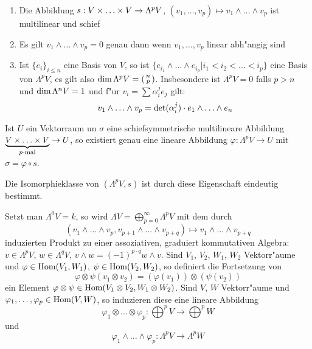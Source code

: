 \begin{emptythm}[Eigenschaften:]\begin{enumerate}[label=\arabic*),leftmargin=*]
\item
	Die Abbildung $s: V \times \ldots \times V \to \Lambda^p V$, $(v_1,\ldots ,v_p) \mapsto v_1 \wedge \ldots \wedge v_p$ ist multilinear und schief
\item
	Es gilt $v_1 \wedge \ldots \wedge v_p = 0$ genau dann wenn $v_1, \ldots , v_p$ linear abh"angig sind
\item
	Ist $\{e_i\}_{i \le n}$ eine Basis von $V$, so ist $\{e_{i_1} \wedge \ldots \wedge e_{i_p} | i_1 < i_2 < \ldots < i_p\}$ eine Basis von $\Lambda^pV$, es gilt also $\operatorname{dim} \Lambda^pV = \left( \begin{smallmatrix} n \\ p \end{smallmatrix} \right)$. Insbesondere ist $\Lambda^pV = 0$ falls $p > n$ und $\operatorname{dim} \Lambda^nV = 1$ und f"ur $v_i = \sum \alpha_i^j e_j$ gilt:
		\[ v_1 \wedge \ldots \wedge v_p = \operatorname{det} (\alpha_i^j) \cdot e_1 \wedge \ldots \wedge e_n \]
\end{enumerate}\end{emptythm}

\begin{emptythm}
Ist $U$ ein Vektorraum un $\sigma$ eine schiefsymmetrische multilineare Abbildung $\underbrace{V \times \ldots  \times V}_{p\text{-mal}} \to U$, so existiert genau eine lineare Abbildung $\varphi: \Lambda^pV \to U$ mit $\sigma = \varphi \circ s$.
\begin{center}\end{center}
Die Isomorphieklasse von $(\Lambda^pV, s)$ ist durch diese Eigenschaft eindeutig bestimmt.
\end{emptythm}

Setzt man $\Lambda^0V = k$, so wird $\Lambda V = \bigoplus_{p=0}^{\infty}\Lambda^pV$ mit dem durch
	\[ (v_1 \wedge \ldots \wedge v_p, v_{p+1} \wedge \ldots \wedge v_{p+q}) \mapsto v_1 \wedge \ldots \wedge v_{p+q} \]
induzierten Produkt zu einer assoziativen, graduiert kommutativen Algebra: $v \in \Lambda^pV$, $w \in \Lambda^qV$, $v \wedge w = (-1)^{p \cdot q} w \wedge v$. Sind $V_1$, $V_2$, $W_1$, $W_2$ Vektorr"aume und $\varphi \in \operatorname{Hom}(V_1, W_1)$, $\psi \in \operatorname{Hom}(V_2, W_2)$, so definiert die Fortsetzung von 
	\[ \varphi \otimes \psi (v_1 \otimes v_2) = (\varphi(v_1)) \otimes (\psi(v_2)) \]
ein Element $\varphi \otimes \psi \in \operatorname{Hom}(V_1 \otimes V_2, W_1 \otimes W_2)$. Sind $V$, $W$ Vektorr"aume und $\varphi_1,\ldots ,\varphi_p \in \operatorname{Hom}(V, W)$, so induzieren diese eine lineare Abbildung
	\[ \varphi_1 \otimes \ldots \otimes \varphi_p : \bigoplus^p V \to \bigoplus^p W \]
und
	\[ \varphi_1 \wedge \ldots  \wedge \varphi_p : \Lambda^pV \to \Lambda^pW \]

